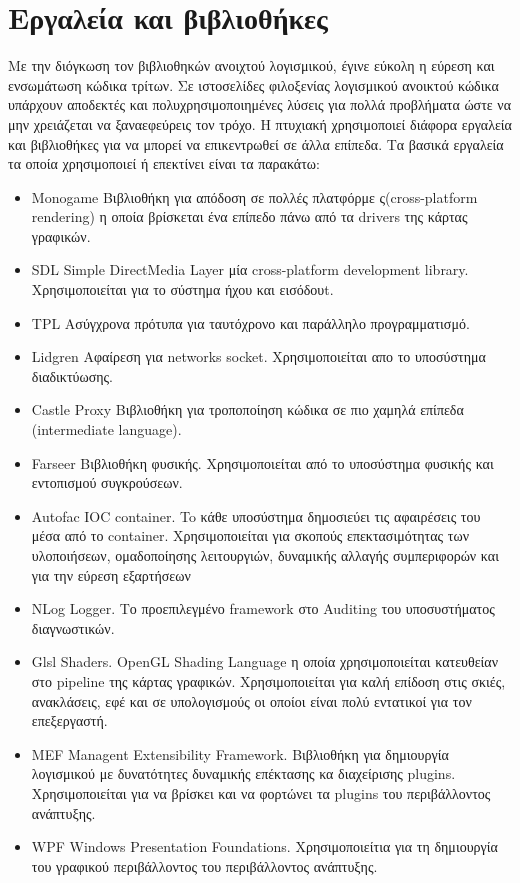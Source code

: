 \section{Εργαλεία και βιβλιοθήκες}
Με την διόγκωση τον βιβλιοθηκών ανοιχτού λογισμικού, έγινε εύκολη η εύρεση και ενσωμάτωση κώδικα τρίτων. Σε ιστοσελίδες φιλοξενίας λογισμικού ανοικτού κώδικα υπάρχουν αποδεκτές και πολυχρησιμοποιημένες λύσεις για πολλά προβλήματα ώστε να μην χρειάζεται να ξαναεφεύρεις τον τρόχο. Η πτυχιακή χρησιμοποιεί διάφορα εργαλεία και βιβλιοθήκες για να μπορεί να επικεντρωθεί σε άλλα επίπεδα. Τα βασικά εργαλεία τα οποία χρησιμοποιεί ή επεκτίνει είναι τα παρακάτω:
\begin{itemize}
	\item{Monogame} Βιβλιοθήκη για απόδοση σε πολλές πλατφόρμε ς(cross-platform rendering) η οποία βρίσκεται ένα επίπεδο πάνω από τα drivers της κάρτας γραφικών.
	\item{SDL} Simple DirectMedia Layer μία cross-platform development library. Χρησιμοποιείται για το σύστημα ήχου και εισόδουt.
	\item{TPL} Ασύγχρονα πρότυπα για ταυτόχρονο και παράλληλο προγραμματισμό.
	\item{Lidgren} Αφαίρεση για networks socket. Χρησιμοποιείται απο το υποσύστημα διαδικτύωσης.
	\item{Castle Proxy} Βιβλιοθήκη για τροποποίηση κώδικα σε πιο χαμηλά επίπεδα (intermediate language).
	\item{Farseer} Βιβλιοθήκη φυσικής. Χρησιμοποιείται από το υποσύστημα φυσικής και εντοπισμού συγκρούσεων.
	\item{Autofac} IOC container. To κάθε υποσύστημα δημοσιεύει τις αφαιρέσεις του μέσα από το container. Χρησιμοποιείται για σκοπούς επεκτασιμότητας των υλοποιήσεων, ομαδοποίησης λειτουργιών, δυναμικής αλλαγής συμπεριφορών και για την εύρεση εξαρτήσεων
	\item{NLog} Logger. Το προεπιλεγμένο framework στο Auditing του υποσυστήματος διαγνωστικών.
	\item{Glsl} Shaders. OpenGL Shading Language η οποία χρησιμοποιείται κατευθείαν στο pipeline της κάρτας γραφικών. Χρησιμοποιείται για καλή επίδοση στις σκιές, ανακλάσεις, εφέ και σε υπολογισμούς οι οποίοι είναι πολύ εντατικοί για τον επεξεργαστή.
	\item{MEF} Managent Extensibility Framework. Βιβλιοθήκη για δημιουργία λογισμικού με δυνατότητες δυναμικής επέκτασης κα διαχείρισης plugins. Χρησιμοποιείται για να βρίσκει και να φορτώνει τα plugins του περιβάλλοντος ανάπτυξης.
	\item{WPF} Windows Presentation Foundations. Χρησιμοποιείτια για τη δημιουργία του γραφικού περιβάλλοντος του περιβάλλοντος ανάπτυξης.

\end{itemize}
